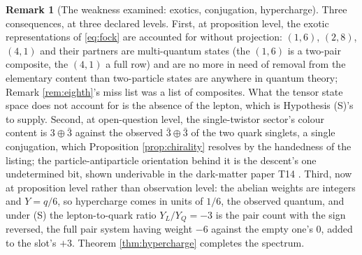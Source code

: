 \documentclass[11pt]{article}
\theoremstyle{definition}
\newtheorem{remark}[theorem]{Remark}
\begin{document}
\begin{remark}[The weakness examined: exotics, conjugation, hypercharge]\label{rem:wound}
Three consequences, at three declared levels. First, at proposition level, the exotic representations of \eqref{eq:fock} are accounted for without projection: $(1,6)$, $(2,8)$, $(4,1)$ and their partners are multi-quantum states (the $(1,6)$ is a two-pair composite, the $(4,1)$ a full row) and are no more in need of removal from the elementary content than two-particle states are anywhere in quantum theory; Remark \ref{rem:eighth}'s miss list was a list of composites. What the tensor state space does not account for is the absence of the lepton, which is Hypothesis (S)'s to supply. Second, at open-question level, the single-twistor sector's colour content is $3 \oplus \bar{3}$ against the observed $\bar{3} \oplus \bar{3}$ of the two quark singlets, a single conjugation, which Proposition \ref{prop:chirality} resolves by the handedness of the listing; the particle-antiparticle orientation behind it is the descent's one undetermined bit, shown underivable in the dark-matter paper T14 \cite[Prop.~5.2]{ButlerT14}. Third, now at proposition level rather than observation level: the abelian weights are integers and $Y = q/6$, so hypercharge comes in units of $1/6$, the observed quantum, and under (S) the lepton-to-quark ratio $Y_{L}/Y_{Q} = -3$ is the pair count with the sign reversed, the full pair system having weight $-6$ against the empty one's $0$, added to the slot's $+3$. Theorem \ref{thm:hypercharge} completes the spectrum.
\end{remark}
\end{document}

